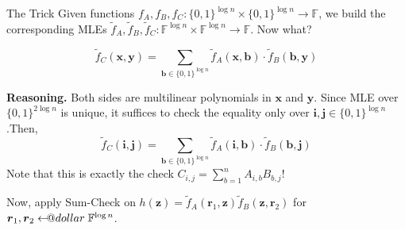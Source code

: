 \documentclass{zkdl-presentation-template}
\makeatletter
\newcommand\leftarrowS{\leftarrow\joinrel\smalldollar}
\newcommand{\smalldollar}{\mathrel{\mathpalette\small@dollar\relax}}
\newcommand{\small@dollar}[2]{%
  \vcenter{\hbox{%
    $#1\textnormal{\fontsize{0.7\dimexpr\f@size pt}{0}\selectfont\$}$%
  }}%
}
\makeatother
\begin{document}
    \begin{frame}{The Trick}
        Given functions $f_A,f_B,f_C: \{0,1\}^{\log n} \times \{0,1\}^{\log n}
        \to \mathbb{F}$, we build the corresponding MLEs $\widetilde{f}_A,
        \widetilde{f}_B, \widetilde{f}_C: \mathbb{F}^{\log n} \times
        \mathbb{F}^{\log n} \to \mathbb{F}$. Now what? \pause

        \begin{lemma}
            \begin{equation*}
                \widetilde{f}_C(\mathbf{x}, \mathbf{y}) = \sum_{\boldsymbol{b} \in
            \{0,1\}^{\log
            n}}\widetilde{f}_A(\mathbf{x},\boldsymbol{b})\cdot\widetilde{f}_B(\boldsymbol{b},\mathbf{y})
            \end{equation*}
        \end{lemma}

        \pause\textcolor{gray!90!black}{\textbf{Reasoning.} Both sides are multilinear polynomials in
        $\mathbf{x}$ and $\mathbf{y}$. Since MLE over $\{0,1\}^{2\log n}$ is
        unique, it suffices to check the equality only over
        $\boldsymbol{i},\boldsymbol{j} \in \{0,1\}^{\log n}$.\pause Then,
        \begin{equation*}
            \widetilde{f}_C(\boldsymbol{i}, \boldsymbol{j}) = \sum_{\boldsymbol{b} \in
            \{0,1\}^{\log
            n}}\widetilde{f}_A(\boldsymbol{i},\boldsymbol{b})\cdot\widetilde{f}_B(\boldsymbol{b},\boldsymbol{j})
        \end{equation*}
        \pause Note that this is exactly the check $C_{i,j} = \sum_{b=1}^n A_{i,b}B_{b,j}$!}

        \pause Now, apply Sum-Check on $h(\mathbf{z}) =
        \widetilde{f}_A(\boldsymbol{r}_1,\mathbf{z})\widetilde{f}_B(\mathbf{z},\boldsymbol{r}_2)$
        for $\boldsymbol{r}_1,\boldsymbol{r}_2 \leftarrowS \mathbb{F}^{\log n}$.
    \end{frame}
\end{document}
